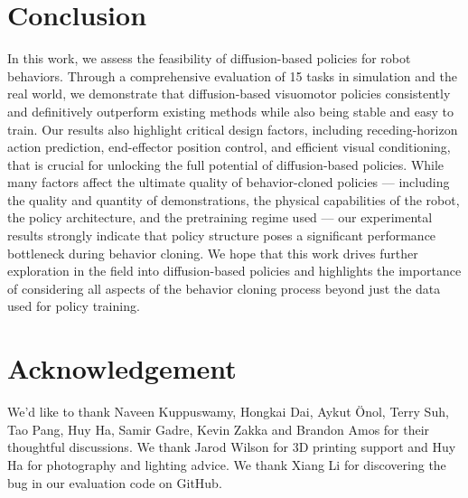 \section{Conclusion}

In this work, we assess the feasibility of diffusion-based policies for robot behaviors. Through a comprehensive evaluation of 15 tasks in simulation and the real world, we demonstrate that diffusion-based visuomotor policies consistently and definitively outperform existing methods while also being stable and easy to train. Our results also highlight critical design factors, including receding-horizon action prediction, end-effector position control, and efficient visual conditioning, that is crucial for unlocking the full potential of diffusion-based policies. While many factors affect the ultimate quality of behavior-cloned policies --- including the quality and quantity of demonstrations, the physical capabilities of the robot, the policy architecture, and the pretraining regime used --- our experimental results strongly indicate that policy structure poses a significant performance bottleneck during behavior cloning. We hope that this work drives further exploration in the field into diffusion-based policies and highlights the importance of considering all aspects of the behavior cloning process beyond just the data used for policy training.


\section{Acknowledgement}

We'd like to thank Naveen Kuppuswamy, Hongkai Dai, Aykut Önol, Terry Suh, Tao Pang, Huy Ha, Samir Gadre, Kevin Zakka and Brandon Amos for their thoughtful discussions. We thank Jarod Wilson for 3D printing support and Huy Ha for photography and lighting advice. We thank Xiang Li for discovering the bug in our evaluation code on GitHub.

